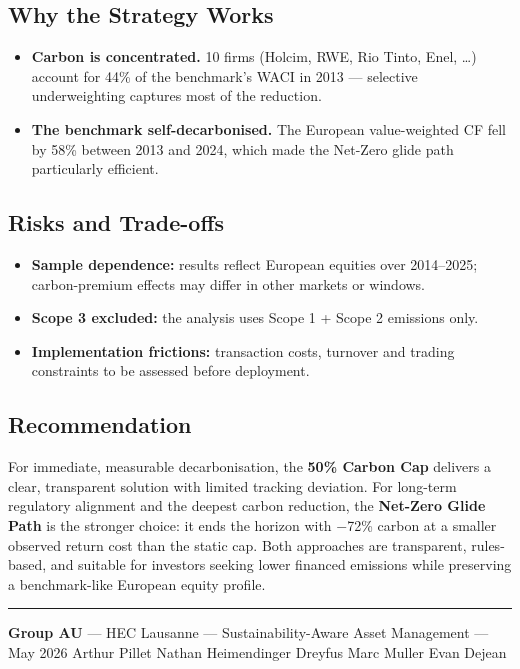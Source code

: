 \documentclass[10pt,a4paper]{article}
\begin{document}
\subsection{Why the Strategy Works}
\begin{itemize}[leftmargin=*, itemsep=0pt, topsep=2pt]
    \item \textbf{Carbon is concentrated.} 10 firms (Holcim, RWE, Rio Tinto,
    Enel, \dots) account for 44\% of the benchmark's WACI in 2013 ---
    selective underweighting captures most of the reduction.
    \item \textbf{The benchmark self-decarbonised.} The European
    value-weighted CF fell by 58\% between 2013 and 2024, which made the
    Net-Zero glide path particularly efficient.
\end{itemize}

\subsection{Risks and Trade-offs}
\begin{itemize}[leftmargin=*, itemsep=0pt, topsep=2pt]
    \item \textbf{Sample dependence:} results reflect European equities over
    2014--2025; carbon-premium effects may differ in other markets or windows.
    \item \textbf{Scope 3 excluded:} the analysis uses Scope 1 + Scope 2
    emissions only.
    \item \textbf{Implementation frictions:} transaction costs, turnover and
    trading constraints to be assessed before deployment.
\end{itemize}

\subsection{Recommendation}
For immediate, measurable decarbonisation, the \textbf{50\% Carbon Cap}
delivers a clear, transparent solution with limited tracking deviation. For
long-term regulatory alignment and the deepest carbon reduction, the
\textbf{Net-Zero Glide Path} is the stronger choice: it ends the horizon
with $-$72\% carbon at a smaller observed return cost than the static cap.
Both approaches are transparent, rules-based, and suitable for investors
seeking lower financed emissions while preserving a benchmark-like European
equity profile.

\vfill
\rule{\linewidth}{0.5pt}
\begin{center}
{\footnotesize \textbf{Group AU} --- HEC Lausanne --- Sustainability-Aware
Asset Management --- May 2026 \quad \textbar \quad Arthur Pillet \quad
Nathan Heimendinger Dreyfus \quad Marc Muller \quad Evan Dejean}
\end{center}
\end{document}
